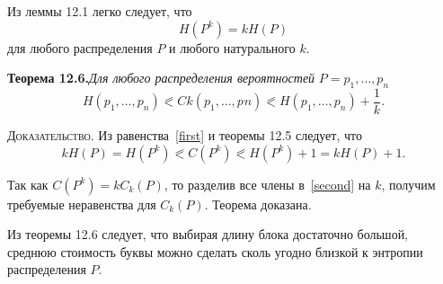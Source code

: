 \documentclass[12pt]{article}
\numberwithin{equation}{section}
\begin{document}
Из леммы 12.1 легко следует, что 
\begin{equation}
H(P^{k}) = kH(P) 
\label{first}
\end{equation} для любого распределения $ P $ и любого натурального $ k $.


{\bf Теорема 12.6.}{\it Для любого распределения вероятностей}
$ P={p_{1},\ldots ,p_{n}}$ $$H(p_{1}, \ldots ,p_{n}) \eqslantless Ck(p_{1},\ldots ,p_{}n) \eqslantless H(p_{1},\ldots ,p_{n}) + \frac{1}{k} .$$


\textsc{Доказательство}. Из равенства~\eqref{first} и теоремы 12.5 следует, что
\begin{equation}
kH(P) = H(P^{k}) \eqslantless C(P^{k}) \eqslantless H(P^{k})+1 = kH(P)+1.
\label{second}
\end{equation}

Так как $ C(P^{k}) = kC_{k}(P) $, то разделив все члены в~\eqref{second} на $ k $, получим требуемые неравенства для  $ C_{k}(P) $. Теорема доказана.\newline

Из теоремы 12.6 следует, что выбирая длину блока достаточно большой,
среднюю стоимость буквы можно сделать сколь угодно близкой к энтропии
распределения $ P $.
\end{document}
